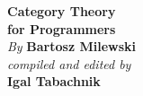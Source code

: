 

\thispagestyle{empty}

\vspace*{80pt}

\begin{raggedleft}
  \fontsize{24pt}{24pt}\selectfont
  \textbf{Category Theory \\ for Programmers}\\
  \ifdefined{}
  \fi
  \vspace*{1cm}
  \fontsize{16pt}{18pt}\selectfont \textit{By } \textbf{Bartosz Milewski}\\
  \vspace{1cm}
  \fontsize{12pt}{14pt}\selectfont \textit{compiled and edited by}\\ \textbf{Igal Tabachnik}\\

\end{raggedleft}


\newpage

\vspace*{0.3\textheight}
\thispagestyle{empty}

